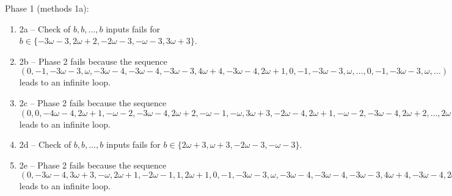 \begin{exmp}
Phase 1 (methods 1a):
\begin{enumerate}[ ]
\item  2a -- Check of $b,b,\dots,b$ inputs fails for $b\in \{-3\omega - 3, 2\omega + 2, -2\omega - 3, -\omega - 3, 3\omega + 3\}$.
\item  2b -- Phase 2   fails because  the sequence $(0, -1, -3\omega - 3, \omega, -3\omega - 4, -3\omega - 4, -3\omega - 3, 4\omega + 4, -3\omega - 4, 2\omega + 1, 0, -1, -3\omega - 3, \omega, \dots ,0, -1, -3\omega - 3, \omega, \dots)$ leads to an infinite loop.
\item  2c -- Phase 2   fails because  the sequence $(0, 0, -4\omega - 4, 2\omega + 1, -\omega - 2, -3\omega - 4, 2\omega + 2, -\omega - 1, -\omega, 3\omega + 3, -2\omega - 4, 2\omega + 1, -\omega - 2, -3\omega - 4, 2\omega + 2, \dots ,2\omega + 1, -\omega - 2, -3\omega - 4, 2\omega + 2, \dots)$ leads to an infinite loop.
\item  2d -- Check of $b,b,\dots,b$ inputs fails for $b\in \{2\omega + 3, \omega + 3, -2\omega - 3, -\omega - 3\}$.
\item  2e -- Phase 2   fails because  the sequence $(0, -3\omega - 4, 3\omega + 3, -\omega, 2\omega + 1, -2\omega - 1, 1, 2\omega + 1, 0, -1, -3\omega - 3, \omega, -3\omega - 4, -3\omega - 4, -3\omega - 3, 4\omega + 4, -3\omega - 4, 2\omega + 1, 0, -1, -3\omega - 3, \dots ,2\omega + 1, 0, -1, -3\omega - 3, \dots)$ leads to an infinite loop.
\end{enumerate}


\end{exmp}




